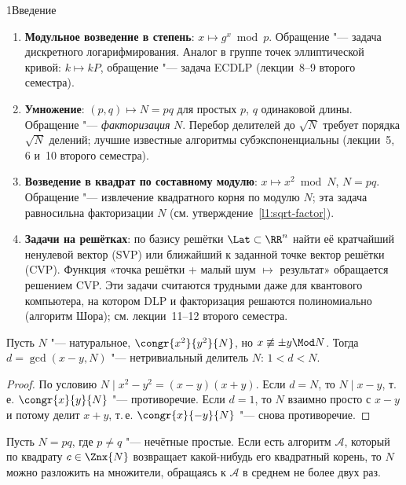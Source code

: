 \begin{lecture}{1}{Введение}
\begin{enumerate}
  \item \textbf{Модульное возведение в степень}: $x \mapsto g^x \bmod p$. Обращение "---
    задача дискретного логарифмирования. Аналог в группе точек эллиптической кривой: $k
    \mapsto kP$, обращение "--- задача ECDLP (лекции~8--9 второго семестра).
  \item \textbf{Умножение}: $(p, q) \mapsto N = pq$ для простых $p$, $q$ одинаковой длины.
    Обращение "--- \emph{факторизация} $N$. Перебор делителей до $\sqrt N$ требует порядка
    $\sqrt N$ делений; лучшие известные алгоритмы субэкспоненциальны (лекции~5, 6 и~10
    второго семестра).
  \item \textbf{Возведение в квадрат по составному модулю}: $x \mapsto x^2 \bmod N$, $N = pq$.
    Обращение "--- извлечение квадратного корня по модулю $N$; эта задача равносильна
    факторизации $N$ (см. утверждение~\ref{l1:sqrt-factor}).
  \item \textbf{Задачи на решётках}: по базису решётки $\Lat \subset \RR^n$ найти её
    кратчайший ненулевой вектор (SVP) или ближайший к заданной точке вектор решётки (CVP).
    Функция «точка решётки + малый шум $\mapsto$ результат» обращается решением CVP.
    Эти задачи считаются трудными даже для квантового компьютера, на котором DLP и
    факторизация решаются полиномиально (алгоритм Шора); см. лекции~11--12 второго семестра.
\end{enumerate}

\begin{lemma}\label{l1:sqrt-gcd}
Пусть $N$ "--- натуральное, $\congr{x^2}{y^2}{N}$, но $x \not\equiv \pm y \Mod N$. Тогда
$d = \gcd(x - y, N)$ "--- нетривиальный делитель $N$: $1 < d < N$.
\end{lemma}

\begin{proof}
По условию $N \mid x^2 - y^2 = (x - y)(x + y)$. Если $d = N$, то $N \mid x - y$, т.\,е.
$\congr{x}{y}{N}$ "--- противоречие. Если $d = 1$, то $N$ взаимно просто с $x - y$ и потому
делит $x + y$, т.\,е. $\congr{x}{-y}{N}$ "--- снова противоречие.
\end{proof}

\begin{proposition}\label{l1:sqrt-factor}
Пусть $N = pq$, где $p \ne q$ "--- нечётные простые. Если есть алгоритм $\mathcal A$, который
по квадрату $c \in \Znx{N}$ возвращает какой-нибудь его квадратный корень, то $N$ можно
разложить на множители, обращаясь к $\mathcal A$ в среднем не более двух раз.
\end{proposition}


\end{lecture}
